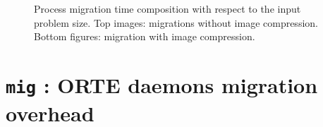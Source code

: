 \begin{figure}[t]
\caption[Process migration time composition]{Process migration time composition with respect to the input problem
size. Top images: migrations without image compression. Bottom figures:
migration  with image compression.}
  \label{fig:migrationstack}%
\end{figure}

\clearpage

\section{\texttt{mig} : ORTE daemons migration overhead}
\label{sec:migoverhead}

